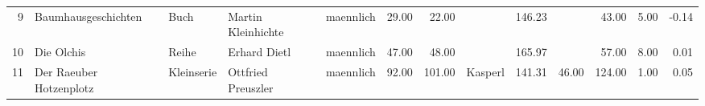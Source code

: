 \begin{sidewaystable}[ht]
\begin{center}
{\begin{tabular}{rllllrrlrrrrr}
  9 & Baumhausgeschichten                                                                                                                                                                                                                                             & Buch & Martin Kleinhichte                                                                                                                                                                                                                                              & maennlich & 29.00 & 22.00 &                                                                                                                                                                                                                                                                 & 146.23 &  & 43.00 & 5.00 & -0.14 \\ 
  10 & Die Olchis                                                                                                                                                                                                                                                      & Reihe & Erhard Dietl                                                                                                                                                                                                                                                    & maennlich & 47.00 & 48.00 &                                                                                                                                                                                                                                                                 & 165.97 &  & 57.00 & 8.00 & 0.01 \\ 
  11 & Der Raeuber Hotzenplotz                                                                                                                                                                                                                                         & Kleinserie & Ottfried Preuszler                                                                                                                                                                                                                                              & maennlich & 92.00 & 101.00 & Kasperl                                                                                                                                                                                                                                                         & 141.31 & 46.00 & 124.00 & 1.00 & 0.05 \\ 

\end{tabular}}
\end{center}
\end{sidewaystable}
